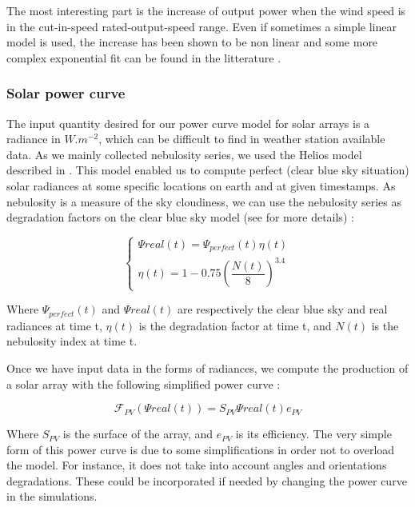 \documentclass[conference]{IEEEtran}
\begin{document}
The most interesting part is the increase of output power when the wind speed is in the cut-in-speed rated-output-speed range. Even if sometimes a simple linear model is used, the increase has been shown to be non linear and some more complex exponential fit can be found in the litterature \cite{Lydia2014}.

\subsubsection{Solar power curve}
The input quantity desired for our power curve model for solar arrays is a radiance in $ W.m^{-2} $, which can be difficult to find in weather station available data. As we mainly collected nebulosity series, we used the Helios model described in \cite{Dans2007}. This model enabled us to compute perfect (clear blue sky situation) solar radiances at some specific locations on earth and at given timestamps. As nebulosity is a measure of the sky cloudiness, we can use the nebulosity series as degradation factors on the clear blue sky model (see \cite{Dans2007} for more details) :

\begin{equation}
\left\{ \begin{array}{lll}
			\Psi{real}(t) = \Psi_{perfect}(t) \eta(t) \\
			\eta(t) = 1-0.75 \left( \dfrac{N(t)}{8} \right)^{3.4}
\end{array} \right.
\end{equation}

Where $ \Psi_{perfect}(t) $ and $ \Psi{real}(t) $ are respectively the clear blue sky and real radiances at time t, $ \eta(t) $ is the degradation factor at time t, and $ N(t) $ is the nebulosity index at time t.

Once we have input data in the forms of radiances, we compute the production of a solar array with the following simplified power curve :

\begin{equation}
\mathcal{F}_{PV}(\Psi{real}(t)) =  S_{PV} \Psi{real}(t)  e_{PV}
\end{equation}

Where $ S_{PV} $ is the surface of the array, and $ e_{PV} $ is its efficiency. The very simple form of this power curve is due to some simplifications in order not to overload the model. For instance, it does not take into account angles and orientations degradations. These could be incorporated if needed by changing the power curve in the simulations.
\end{document}
